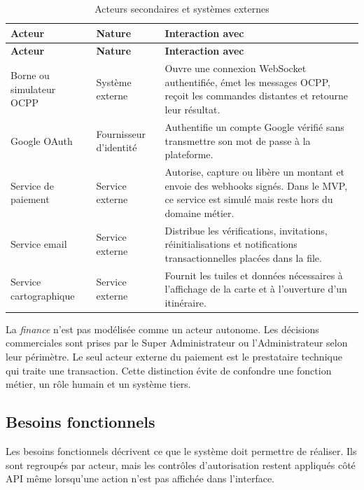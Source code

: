 \begin{longtable}{|C{3.15cm}|C{2.15cm}|p{8.15cm}|}
  \caption{Acteurs secondaires et systèmes externes}
  \label{tab:external-actors}\\
  \hline
  \textbf{Acteur} & \textbf{Nature} & \textbf{Interaction avec \ProjectName{}}\\
  \hline
  \endfirsthead
  \hline
  \textbf{Acteur} & \textbf{Nature} & \textbf{Interaction avec \ProjectName{}}\\
  \hline
  \endhead
  Borne ou simulateur OCPP & Système externe &
  Ouvre une connexion WebSocket authentifiée, émet les messages OCPP, reçoit les
  commandes distantes et retourne leur résultat.\\\hline
  Google OAuth & Fournisseur d'identité &
  Authentifie un compte Google vérifié sans transmettre son mot de passe à la
  plateforme.\\\hline
  Service de paiement & Service externe &
  Autorise, capture ou libère un montant et envoie des webhooks signés. Dans le MVP,
  ce service est simulé mais reste hors du domaine métier.\\\hline
  Service email & Service externe &
  Distribue les vérifications, invitations, réinitialisations et notifications
  transactionnelles placées dans la file.\\\hline
  Service cartographique & Service externe &
  Fournit les tuiles et données nécessaires à l'affichage de la carte et à
  l'ouverture d'un itinéraire.\\
  \hline
\end{longtable}

\begin{scopebox}
  La \emph{finance} n'est pas modélisée comme un acteur autonome. Les décisions
  commerciales sont prises par le Super Administrateur ou l'Administrateur selon
  leur périmètre. Le seul acteur externe du paiement est le prestataire technique qui
  traite une transaction. Cette distinction évite de confondre une fonction métier,
  un rôle humain et un système tiers.
\end{scopebox}

\subsection{Besoins fonctionnels}

Les besoins fonctionnels décrivent ce que le système doit permettre de réaliser. Ils
sont regroupés par acteur, mais les contrôles d'autorisation restent appliqués côté
API même lorsqu'une action n'est pas affichée dans l'interface.

